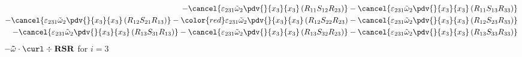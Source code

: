 \begin{equation}
\begin{split}
		-\cancel{\varepsilon_{231}\tilde{\omega}_{2}\pdv{}{x_{3}}{x_{3}}\left(R_{11}S_{12}R_{23}\right)}
		-\cancel{\varepsilon_{231}\tilde{\omega}_{2}\pdv{}{x_{3}}{x_{3}}\left(R_{11}S_{13}R_{33}\right)}\\
		-\cancel{\varepsilon_{231}\tilde{\omega}_{2}\pdv{}{x_{3}}{x_{3}}\left(R_{12}S_{21}R_{13}\right)}
		-{\color{red}\varepsilon_{231}\tilde{\omega}_{2}\pdv{}{x_{3}}{x_{3}}\left(R_{12}S_{22}R_{23}\right)}
		-\cancel{\varepsilon_{231}\tilde{\omega}_{2}\pdv{}{x_{3}}{x_{3}}\left(R_{12}S_{23}R_{33}\right)}\\
		-\cancel{\varepsilon_{231}\tilde{\omega}_{2}\pdv{}{x_{3}}{x_{3}}\left(R_{13}S_{31}R_{13}\right)}
		-\cancel{\varepsilon_{231}\tilde{\omega}_{2}\pdv{}{x_{3}}{x_{3}}\left(R_{13}S_{32}R_{23}\right)}
		-\cancel{\varepsilon_{231}\tilde{\omega}_{2}\pdv{}{x_{3}}{x_{3}}\left(R_{13}S_{33}R_{33}\right)}\\
	\end{split}
\end{equation}
$-\mathbf{\tilde{\omega}}\cdot\curl \div \mathbf{RSR}$ for $i=3$
